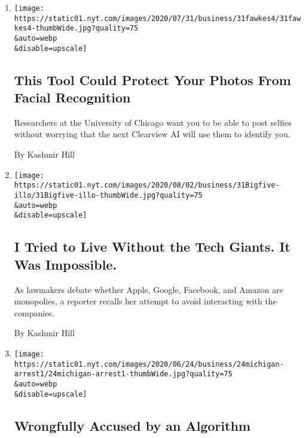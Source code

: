 \begin{enumerate}
\def\labelenumi{\arabic{enumi}.}
\item
  \href{/2020/08/03/technology/fawkes-tool-protects-photos-from-facial-recognition.html}{}

  \texttt{[image: https://static01.nyt.com/images/2020/07/31/business/31fawkes4/31fawkes4-thumbWide.jpg?quality=75\\\&auto=webp\\\&disable=upscale]}

  \hypertarget{this-tool-could-protect-your-photos-from-facial-recognition}{%
  \subsection{This Tool Could Protect Your Photos From Facial
  Recognition}\label{this-tool-could-protect-your-photos-from-facial-recognition}}

  Researchers at the University of Chicago want you to be able to post
  selfies without worrying that the next Clearview AI will use them to
  identify you.

  By Kashmir Hill
\item
  \href{/2020/07/31/technology/blocking-the-tech-giants.html}{}

  \texttt{[image: https://static01.nyt.com/images/2020/08/02/business/31Bigfive-illo/31Bigfive-illo-thumbWide.jpg?quality=75\\\&auto=webp\\\&disable=upscale]}

  \hypertarget{i-tried-to-live-without-the-tech-giants-it-was-impossible}{%
  \subsection{I Tried to Live Without the Tech Giants. It Was
  Impossible.}\label{i-tried-to-live-without-the-tech-giants-it-was-impossible}}

  As lawmakers debate whether Apple, Google, Facebook, and Amazon are
  monopolies, a reporter recalls her attempt to avoid interacting with
  the companies.

  By Kashmir Hill
\item
  \href{/2020/06/24/technology/facial-recognition-arrest.html}{}

  \texttt{[image: https://static01.nyt.com/images/2020/06/24/business/24michigan-arrest1/24michigan-arrest1-thumbWide.jpg?quality=75\\\&auto=webp\\\&disable=upscale]}

  \hypertarget{wrongfully-accused-by-an-algorithm}{%
  \subsection{Wrongfully Accused by an
  Algorithm}\label{wrongfully-accused-by-an-algorithm}}


\end{enumerate}
